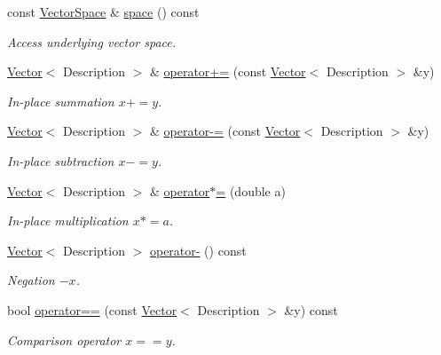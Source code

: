 \begin{DoxyCompactItemize}
\item 
\hypertarget{classSpacy_1_1VectorBase_aa999dbf9d679d895dfe04c10fbf9f5e9}{}const \hyperlink{classSpacy_1_1VectorSpace}{Vector\+Space} \& \hyperlink{classSpacy_1_1VectorBase_aa999dbf9d679d895dfe04c10fbf9f5e9}{space} () const \label{classSpacy_1_1VectorBase_aa999dbf9d679d895dfe04c10fbf9f5e9}

\begin{DoxyCompactList}\small\item\em Access underlying vector space. \end{DoxyCompactList}\item 
\hyperlink{classSpacy_1_1Kaskade_1_1Vector}{Vector}$<$ Description $>$ \& \hyperlink{classSpacy_1_1AddArithmeticOperators_afad1d01e1e8c6f75290ac46d9b047ea8}{operator+=} (const \hyperlink{classSpacy_1_1Kaskade_1_1Vector}{Vector}$<$ Description $>$ \&y)
\begin{DoxyCompactList}\small\item\em In-\/place summation $ x+=y$. \end{DoxyCompactList}\item 
\hyperlink{classSpacy_1_1Kaskade_1_1Vector}{Vector}$<$ Description $>$ \& \hyperlink{classSpacy_1_1AddArithmeticOperators_a9fa91e177d13203cfe8cfa991c64ca36}{operator-\/=} (const \hyperlink{classSpacy_1_1Kaskade_1_1Vector}{Vector}$<$ Description $>$ \&y)
\begin{DoxyCompactList}\small\item\em In-\/place subtraction $ x-=y$. \end{DoxyCompactList}\item 
\hyperlink{classSpacy_1_1Kaskade_1_1Vector}{Vector}$<$ Description $>$ \& \hyperlink{classSpacy_1_1AddArithmeticOperators_a1d3db95b24fd2bc1de712c9e04c47e2f}{operator$\ast$=} (double a)
\begin{DoxyCompactList}\small\item\em In-\/place multiplication $ x*=a$. \end{DoxyCompactList}\item 
\hyperlink{classSpacy_1_1Kaskade_1_1Vector}{Vector}$<$ Description $>$ \hyperlink{classSpacy_1_1AddArithmeticOperators_a5acd030bf265d130983fd6e3c5b68be5}{operator-\/} () const
\begin{DoxyCompactList}\small\item\em Negation $ -x$. \end{DoxyCompactList}\item 
bool \hyperlink{classSpacy_1_1AddArithmeticOperators_a5ff1909f49f4a705d69663dc2d4b6316}{operator==} (const \hyperlink{classSpacy_1_1Kaskade_1_1Vector}{Vector}$<$ Description $>$ \&y) const
\begin{DoxyCompactList}\small\item\em Comparison operator $ x==y$. \end{DoxyCompactList}\end{DoxyCompactItemize}


